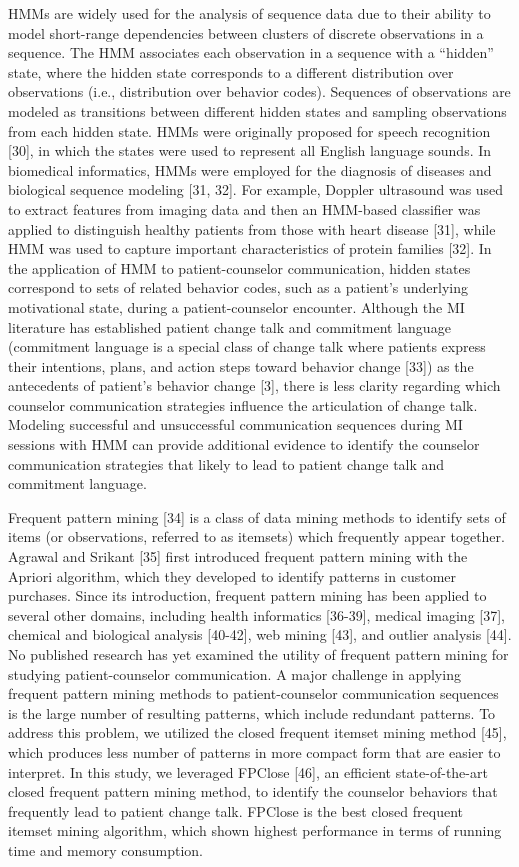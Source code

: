 HMMs are widely used for the analysis of sequence data due to their ability to model short-range dependencies between clusters of discrete observations in a sequence. The HMM associates each observation in a sequence with a “hidden” state, where the hidden state corresponds to a different distribution over observations (i.e., distribution over behavior codes). Sequences of observations are modeled as transitions between different hidden states and sampling observations from each hidden state. HMMs were originally proposed for speech recognition [30], in which the states were used to represent all English language sounds. In biomedical informatics, HMMs were employed for the diagnosis of diseases and biological sequence modeling [31, 32]. For example, Doppler ultrasound was used to extract features from imaging data and then an HMM-based classifier was applied to distinguish healthy patients from those with heart disease [31], while HMM was used to capture important characteristics of protein families [32]. In the application of HMM to patient-counselor communication, hidden states correspond to sets of related behavior codes, such as a patient’s underlying motivational state, during a patient-counselor encounter. Although the MI literature has established patient change talk and commitment language (commitment language is a special class of change talk where patients express their intentions, plans, and action steps toward behavior change [33]) as the antecedents of patient’s behavior change [3], there is less clarity regarding which counselor communication strategies influence the articulation of change talk. Modeling successful and unsuccessful communication sequences during MI sessions with HMM can provide additional evidence to identify the counselor communication strategies that likely to lead to patient change talk and commitment language. 

Frequent pattern mining [34] is a class of data mining methods to identify sets of items (or observations, referred to as itemsets) which frequently appear together. Agrawal and Srikant [35] first introduced frequent pattern mining with the Apriori algorithm, which they developed to identify patterns in customer purchases. Since its introduction, frequent pattern mining has been applied to several other domains, including health informatics [36-39], medical imaging [37], chemical and biological analysis [40-42], web mining [43], and outlier analysis [44]. No published research has yet examined the utility of frequent pattern mining for studying patient-counselor communication. A major challenge in applying frequent pattern mining methods to patient-counselor communication sequences is the large number of resulting patterns, which include redundant patterns. To address this problem, we utilized the closed frequent itemset mining method [45], which produces less number of patterns in more compact form that are easier to interpret. In this study, we leveraged FPClose [46], an efficient state-of-the-art closed frequent pattern mining method, to identify the counselor behaviors that frequently lead to patient change talk. FPClose is the best closed frequent itemset mining algorithm, which shown highest performance in terms of running time and memory consumption.

